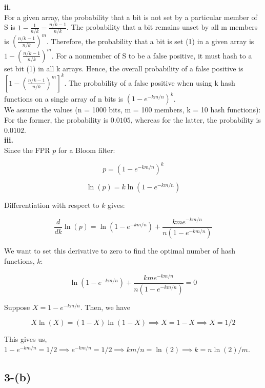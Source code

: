 \documentclass{article}
\begin{document}
\textbf{ii.} \\


For a given array, the probability that a bit is not set by a particular member of S is \( 1 - \frac{1}{n/k} = \frac{n/k - 1}{n/k} \).
The probability that a bit remains unset by all m members is \( \left( \frac{n/k - 1}{n/k} \right)^m \).
Therefore, the probability that a bit is set (1) in a given array is \( 1 - \left( \frac{n/k - 1}{n/k} \right)^m \).
For a nonmember of S to be a false positive, it must hash to a set bit (1) in all k arrays. Hence, the overall probability of a false positive is \( \left[ 1 - \left( \frac{n/k - 1}{n/k} \right)^m \right]^k \).
The probability of a false positive when using k hash functions on a single array of n bits is \( (1 - e^{-km/n})^k \). \\



We assume the values (n = 1000 bits, m = 100 members, k = 10 hash functions):
For the former, the probability is \(0.0105\), whereas for the latter, the probability is \(0.0102\). \\


\textbf{iii.} \\

Since the FPR \( p \) for a Bloom filter:

\[ p = \left(1 - e^{-km/n}\right)^k \]

\[ \ln(p) = k \ln\left(1 - e^{-km/n}\right) \]

Differentiation with respect to \( k \) gives: 

\[ \frac{d}{dk}\ln(p) = \ln\left(1 - e^{-km/n}\right) + \frac{kme^{-km/n}}{n\left(1 - e^{-km/n}\right)} \]

We want to set this derivative to zero to find the optimal number of hash functions, \( k \):

\[ \ln\left(1 - e^{-km/n}\right) + \frac{kme^{-km/n}}{n\left(1 - e^{-km/n}\right)} = 0 \]

Suppose \(X = 1-e^{-km/n}\). Then, we have

\[
    X\ln(X) = (1-X)\ln(1-X) \implies X = 1-X \implies X = 1/2
\]

This gives us, \( 1 - e^{-km/n} = 1/2 \implies e^{-km/n} = 1/2 \implies km/n = \ln(2) \implies k = n\ln(2)/m \). \\

\subsection*{3-(b)}
\end{document}
